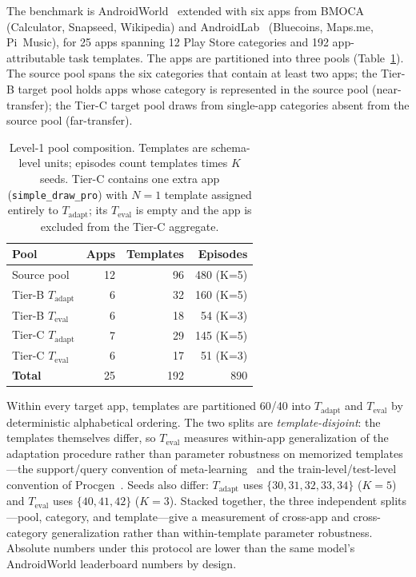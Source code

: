 The benchmark is AndroidWorld~\citep{rawles2024androidworld} extended with six
apps from BMOCA (Calculator, Snapseed, Wikipedia) and
AndroidLab~\citep{xu2024androidlab} (Bluecoins, Maps.me, Pi~Music), for 25 apps
spanning 12 Play Store categories and 192 app-attributable task templates. The
apps are partitioned into three pools (Table~\ref{tab:aw-splits}). The source
pool spans the six categories that contain at least two apps; the Tier-B target
pool holds apps whose category is represented in the source pool
(near-transfer); the Tier-C target pool draws from single-app categories absent
from the source pool (far-transfer).

\begin{table}[t]
\small
\centering
\begin{tabular}{lrrr}
\hline
\textbf{Pool} & \textbf{Apps} & \textbf{Templates} & \textbf{Episodes} \\
\hline
Source pool                & 12 & 96  & 480 (K=5) \\
Tier-B $T_{\text{adapt}}$  &  6 & 32  & 160 (K=5) \\
Tier-B $T_{\text{eval}}$   &  6 & 18  &  54 (K=3) \\
Tier-C $T_{\text{adapt}}$  &  7 & 29  & 145 (K=5) \\
Tier-C $T_{\text{eval}}$   &  6 & 17  &  51 (K=3) \\
\hline
\textbf{Total}             & 25 & 192 & 890 \\
\hline
\end{tabular}
\caption{Level-1 pool composition. Templates are schema-level units; episodes
count templates times $K$ seeds. Tier-C contains one extra app
(\texttt{simple\_draw\_pro}) with $N{=}1$ template assigned entirely to
$T_{\text{adapt}}$; its $T_{\text{eval}}$ is empty and the app is excluded from
the Tier-C aggregate.}
\label{tab:aw-splits}
\end{table}

Within every target app, templates are partitioned 60/40 into $T_{\text{adapt}}$
and $T_{\text{eval}}$ by deterministic alphabetical ordering. The two splits are
\emph{template-disjoint}: the templates themselves differ, so $T_{\text{eval}}$
measures within-app generalization of the adaptation procedure rather than
parameter robustness on memorized templates---the support/query convention of
meta-learning~\citep{finn2017maml} and the train-level/test-level convention of
Procgen~\citep{cobbe2020procgen}. Seeds also differ: $T_{\text{adapt}}$ uses
$\{30,31,32,33,34\}$ ($K{=}5$) and $T_{\text{eval}}$ uses $\{40,41,42\}$
($K{=}3$). Stacked together, the three independent splits---pool, category, and
template---give a measurement of cross-app and cross-category generalization
rather than within-template parameter robustness. Absolute numbers under this
protocol are lower than the same model's AndroidWorld leaderboard numbers by
design.

